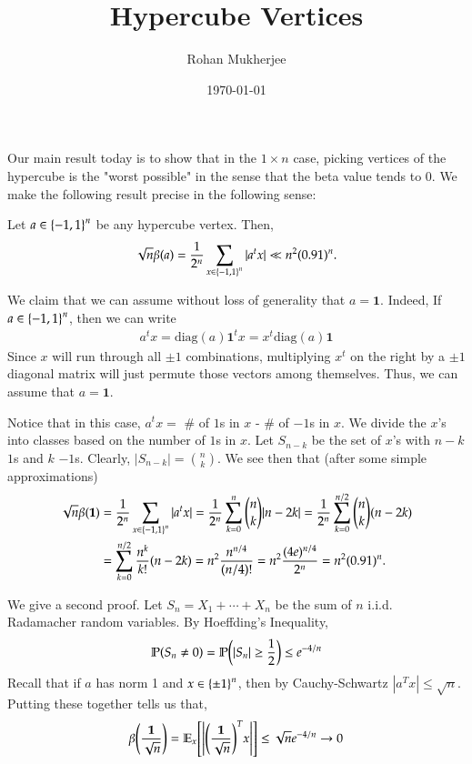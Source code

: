 \documentclass[12pt]{article}
\title{Hypercube Vertices}
\date{\today}
\author{Rohan Mukherjee}
\newenvironment{theorem}{\begin{mytheorem}}{\end{mytheorem}}
\theoremstyle{definitionstyle}
\newcommand{\SET}[1]{\Set{\mskip-\medmuskip #1 \mskip-\medmuskip}}
\renewcommand{\P}{\mathbb P \qty}
\newcommand{\E}{\mathbb E}
\begin{document}
    \maketitle
    Our main result today is to show that in the $1 \times n$ case, picking vertices of the hypercube is the "worst possible" in the sense that the beta value tends to 0. We make the following result precise in the following sense:

    \begin{theorem}[Hypercube Vertices Scale Poorly]
        Let $a \in \SET{-1, 1}^n$ be any hypercube vertex. Then,
        \begin{align*}
            \sqrt{n}\beta(a) = \frac{1}{2^n} \sum_{x \in \SET{-1, 1}^n} |a^tx| \ll n^2(0.91)^n.
        \end{align*}
    \end{theorem}
    We claim that we can assume without loss of generality that $a = \mathbf{1}$. Indeed, If $a \in \SET{-1, 1}^n$, then we can write
    \begin{align*}
        a^tx = \mathrm{diag}(a) \mathbf{1}^tx = x^t\mathrm{diag}(a)\mathbf{1}
    \end{align*}
    Since $x$ will run through all $\pm 1$ combinations, multiplying $x^t$ on the right by a $\pm 1$ diagonal matrix will just permute those vectors among themselves. Thus, we can assume that $a = \mathbf{1}$.

    Notice that in this case, $a^tx = $ \# of $1$s in $x$ - \# of $-1$s in $x$. We divide the $x$'s into classes based on the number of $1$s in $x$. Let $S_{n-k}$ be the set of $x$'s with $n-k$ $1$s and $k$ $-1$s. Clearly, $|S_{n-k}| = {n \choose k}$. We see then that (after some simple approximations)
    \begin{align*}
        \sqrt{n}\beta(\mathbf{1}) &= \frac{1}{2^n} \sum_{x \in \SET{-1, 1}^n} |a^tx| = \frac{1}{2^n} \sum_{k=0}^n {n \choose k} |n-2k| = \frac{1}{2^n} \sum_{k=0}^{n/2} {n \choose k} (n-2k) \\
        &= \sum_{k=0}^{n/2} \frac{n^k}{k!} (n-2k) = n^2 \frac{n^{n/4}}{(n/4)!} = n^2\frac{(4e)^{n/4}}{2^n} = n^2(0.91)^n.
    \end{align*}

    We give a second proof. Let $S_n = X_1 + \cdots + X_n$ be the sum of $n$ i.i.d. Radamacher random variables. By Hoeffding's Inequality,
    \begin{align*}
        \P(S_n \neq 0) = \P(|S_n| \geq \frac 12) \leq e^{-4/n}
    \end{align*}
    Recall that if $a$ has norm 1 and $x \in \SET{\pm 1}^n$, then by Cauchy-Schwartz $|a^Tx| \leq \sqrt{n}$. Putting these together tells us that,
    \begin{align*}
        \beta\qty(\frac{\mathbf 1}{\sqrt{n}}) = \E_{x}\qty[\qty|\qty(\frac{\mathbf 1}{\sqrt{n}})^T x|] \leq \sqrt{n}e^{-4/n}  \to 0
    \end{align*}
\end{document}
